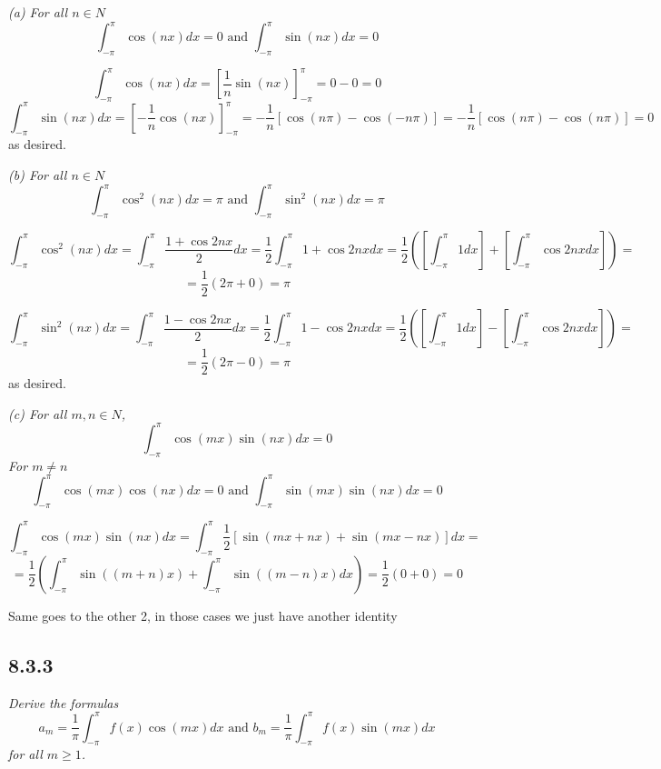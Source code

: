 \documentclass[11pt,oneside,titlepage]{book}
\begin{document}
\textit{(a) For all $n \in N$}
$$\int_{-\pi}^\pi{\cos(nx) dx} = 0 \text{ and } \int_{-\pi}^\pi{\sin(nx) dx} = 0 $$

$$\int_{-\pi}^\pi{\cos(nx) dx} = \left[ \frac{1}{n} \sin (nx) \right]_{-\pi}^\pi =  0 - 0 = 0$$
$$\int_{-\pi}^\pi{\sin(nx) dx} = \left[ - \frac{1}{n} \cos (nx) \right]_{-\pi}^\pi =
- \frac{1}{n} \left[\cos (n \pi) - \cos(- n \pi)\right] =
- \frac{1}{n} \left[\cos (n \pi) - \cos(n \pi)\right] = 0$$
as desired.

\textit{(b) For all $n \in N$}
$$\int_{- \pi}^\pi{\cos^2(nx) dx} = \pi \text{ and }\int_{- \pi}^\pi{\sin^2(nx) dx} = \pi$$

$$\int_{- \pi}^\pi{\cos^2(nx) dx} = \int_{- \pi}^\pi{\frac{1 + \cos 2nx}{2} dx}
= \frac 1 2 \int_{- \pi}^\pi{1 + \cos 2nx dx} 
= \frac 1 2 \left(\left[\int_{- \pi}^\pi{1 dx}\right] +
  \left[\int_{- \pi}^\pi{\cos 2nx dx}\right]\right) =$$
$$ =
\frac 1 2 \left(2 \pi + 0\right) = \pi
$$

$$\int_{- \pi}^\pi{\sin^2(nx) dx} = \int_{- \pi}^\pi{\frac{1 - \cos 2nx}{2} dx}
= \frac 1 2 \int_{- \pi}^\pi{1 - \cos 2nx dx} 
= \frac 1 2 \left(\left[\int_{- \pi}^\pi{1 dx}\right] -
  \left[\int_{- \pi}^\pi{\cos 2nx dx}\right]\right) =$$
$$ =
\frac 1 2 \left(2 \pi - 0\right) = \pi
$$
as desired.

\textit{(c) For all $m, n \in N$,}
$$\int_{- \pi}^\pi{\cos(mx) \sin(nx) dx} = 0 $$
\textit{For $m \neq n$}
$$\int_{- \pi}^\pi{\cos(mx) \cos(nx) dx} = 0 \text{ and } \int_{- \pi}^\pi{\sin(mx) \sin(nx) dx} = 0$$

$$\int_{- \pi}^\pi{\cos(mx) \sin(nx) dx} =
\int_{- \pi}^\pi{\frac{1}{2}\left[ \sin(mx + nx) + \sin(mx - nx)\right] dx} =
$$
$$=
\frac{1}{2}\left( \int_{- \pi}^\pi{\sin((m + n)x)} + \int_{- \pi}^\pi{\sin((m - n)x)dx} \right)=
\frac 1 2 (0 + 0) = 0
$$

Same goes to the other 2, in those cases we just have another identity

\subsection*{8.3.3}
\textit{Derive the formulas}
$$a_m = \frac 1 \pi \int_{-\pi}^\pi{f(x) \cos (mx) dx} \text{ and }
b_m = \frac 1 \pi \int_{-\pi}^\pi{f(x) \sin (mx) dx} $$
\textit{for all $m \geq 1$.}
\end{document}
